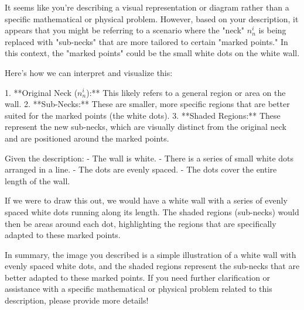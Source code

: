 It seems like you're describing a visual representation or diagram rather than a specific mathematical or physical problem. However, based on your description, it appears that you might be referring to a scenario where the "neck" \( n^i_n \) is being replaced with "sub-necks" that are more tailored to certain "marked points." In this context, the "marked points" could be the small white dots on the white wall.

Here's how we can interpret and visualize this:

1. **Original Neck (\( n^i_n \)):** This likely refers to a general region or area on the wall.
2. **Sub-Necks:** These are smaller, more specific regions that are better suited for the marked points (the white dots).
3. **Shaded Regions:** These represent the new sub-necks, which are visually distinct from the original neck and are positioned around the marked points.

Given the description:
- The wall is white.
- There is a series of small white dots arranged in a line.
- The dots are evenly spaced.
- The dots cover the entire length of the wall.

If we were to draw this out, we would have a white wall with a series of evenly spaced white dots running along its length. The shaded regions (sub-necks) would then be areas around each dot, highlighting the regions that are specifically adapted to these marked points.

In summary, the image you described is a simple illustration of a white wall with evenly spaced white dots, and the shaded regions represent the sub-necks that are better adapted to these marked points. If you need further clarification or assistance with a specific mathematical or physical problem related to this description, please provide more details!